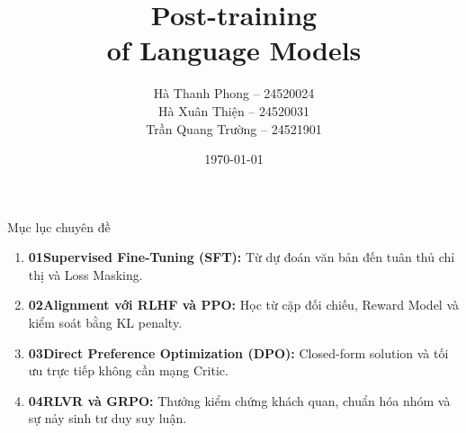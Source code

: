 \documentclass[11pt,aspectratio=169]{beamer}
\title[Post-training of Language Models]{Post-training\\of Language Models}
\author[Nhóm thực hiện]{%
  Hà Thanh Phong -- 24520024\\
  Hà Xuân Thiện -- 24520031\\
  Trần Quang Trường -- 24521901}
\institute{University of Information Technology -- VNUHCM}
\date{\today}
\begin{document}
\begin{frame}
  \titlepage
\end{frame}

\begin{frame}{Mục lục chuyên đề}
  \vspace{0.15cm}
  \small
  \begin{enumerate}\setlength{\itemsep}{6pt}
    \item \textbf{\textcolor{reforange}{01}\quad Supervised Fine-Tuning (SFT):} Từ dự đoán văn bản đến tuân thủ chỉ thị và Loss Masking.
    \item \textbf{\textcolor{reforange}{02}\quad Alignment với RLHF và PPO:} Học từ cặp đối chiếu, Reward Model và kiểm soát bằng KL penalty.
    \item \textbf{\textcolor{reforange}{03}\quad Direct Preference Optimization (DPO):} Closed-form solution và tối ưu trực tiếp không cần mạng Critic.
    \item \textbf{\textcolor{reforange}{04}\quad RLVR và GRPO:} Thưởng kiểm chứng khách quan, chuẩn hóa nhóm và sự nảy sinh tư duy suy luận.
  \end{enumerate}
  \par\vspace{0pt}
\end{frame}





\end{document}
